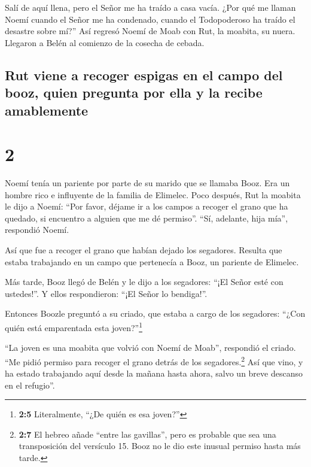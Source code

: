  Salí de aquí llena, pero el Señor me ha traído a casa
vacía. ¿Por qué me llaman Noemí cuando el Señor me ha condenado, cuando
el Todopoderoso ha traído el desastre sobre mí?''  Así
regresó Noemí de Moab con Rut, la moabita, su nuera. Llegaron a Belén al
comienzo de la cosecha de cebada.

\hypertarget{rut-viene-a-recoger-espigas-en-el-campo-del-booz-quien-pregunta-por-ella-y-la-recibe-amablemente}{%
\subsection{Rut viene a recoger espigas en el campo del booz, quien
pregunta por ella y la recibe
amablemente}\label{rut-viene-a-recoger-espigas-en-el-campo-del-booz-quien-pregunta-por-ella-y-la-recibe-amablemente}}

\hypertarget{section-1}{%
\section{2}\label{section-1}}

 Noemí tenía un pariente por parte de su marido que se
llamaba Booz. Era un hombre rico e influyente de la familia de Elimelec.
 Poco después, Rut la moabita le dijo a Noemí: ``Por
favor, déjame ir a los campos a recoger el grano que ha quedado, si
encuentro a alguien que me dé permiso''. ``Sí, adelante, hija mía'',
respondió Noemí.

 Así que fue a recoger el grano que habían dejado los
segadores. Resulta que estaba trabajando en un campo que pertenecía a
Booz, un pariente de Elimelec.

 Más tarde, Booz llegó de Belén y le dijo a los segadores:
``¡El Señor esté con ustedes!''. Y ellos respondieron: ``¡El Señor lo
bendiga!''.

 Entonces Boozle preguntó a su criado, que estaba a cargo
de los segadores: ``¿Con quién está emparentada esta joven?''\footnote{\textbf{2:5}
  Literalmente, ``¿De quién es esa joven?''}

 ``La joven es una moabita que volvió con Noemí de Moab'',
respondió el criado.  ``Me pidió permiso para recoger el
grano detrás de los segadores.\footnote{\textbf{2:7} El hebreo añade
  ``entre las gavillas'', pero es probable que sea una transposición del
  versículo 15. Booz no le dio este inusual permiso hasta más tarde.}
Así que vino, y ha estado trabajando aquí desde la mañana hasta ahora,
salvo un breve descanso en el refugio''.

